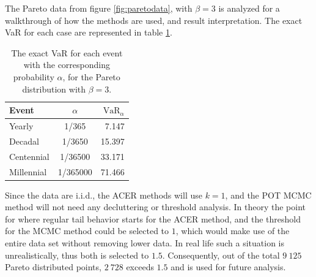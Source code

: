 The Pareto data from figure \ref{fig:paretodata}, with $\beta=3$ is analyzed for a walkthrough of how the methods are used, and result interpretation. The exact VaR for each case are represented in table \ref{table:paretovar}.

\begin{table}[h]
\centering
\begin{tabular}{ l c r}
  Event & $\alpha$ & $\text{VaR}_\alpha$  \\
  \hline
  Yearly & 1/365 & 7.147 \\
  Decadal & 1/3650 & 15.397\\
  Centennial & 1/36500 & 33.171\\
  Millennial & 1/365000 & 71.466\\
\end{tabular}
\caption{The exact VaR for each event with the corresponding probability $\alpha$, for the Pareto distribution with $\beta=3$.}
\label{table:paretovar}
\end{table}

Since the data are i.i.d., the ACER methods will use $k=1$, and the POT MCMC method will not need any decluttering or threshold analysis. In theory the point for where regular tail behavior starts for the ACER method, and the threshold for the MCMC method could be selected to $1$, which would make use of the entire data set without removing lower data. In real life such a situation is unrealistically, thus both is selected to $1.5$. Consequently, out of the total $9 \ 125$ Pareto distributed points, $2 \ 728$ exceeds $1.5$ and is used for future analysis.

